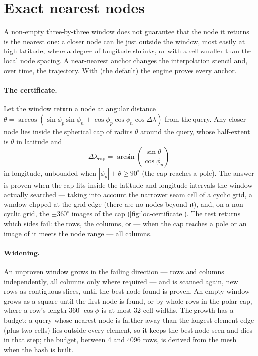 \section{Exact nearest nodes}\label{sec:loc-exact}

A non-empty three-by-three window does not guarantee that the node it returns is the nearest one: a
closer node can lie just outside the window, most easily at high latitude, where a degree of longitude
shrinks, or with a cell smaller than the local node spacing. A near-nearest anchor changes the
interpolation stencil and, over time, the trajectory. With  (the
default) the engine proves every anchor.

\paragraph{The certificate.} Let the window return a node at angular distance
$\theta=\arccos(\sin\phi_p\sin\phi_n+\cos\phi_p\cos\phi_n\cos\Delta\lambda)$ from the query. Any closer
node lies inside the spherical cap of radius $\theta$ around the query, whose half-extent is $\theta$
in latitude and
\begin{equation}\label{eq:loc-cap}
  \Delta\lambda_{\text{cap}}=\arcsin\!\left(\frac{\sin\theta}{\cos\phi_p}\right)
\end{equation}
in longitude, unbounded when $|\phi_p|+\theta\ge 90^\circ$ (the cap reaches a pole). The answer is
proven when the cap fits inside the latitude and longitude intervals the window actually searched ---
taking into account the narrower seam cell of a cyclic grid, a window clipped at the grid edge (there
are no nodes beyond it), and, on a non-cyclic grid, the $\pm360^\circ$ images of the cap
(\cref{fig:loc-certificate}). The test returns which sides fail: the rows, the columns, or --- when the
cap reaches a pole or an image of it meets the node range --- all columns.

\paragraph{Widening.} An unproven window grows in the failing direction --- rows and columns
independently, all columns only where required --- and is scanned again, new rows as contiguous slices,
until the best node found is proven. An empty window grows as a square until the first node is found,
or by whole rows in the polar cap, where a row's length $360^\circ\cos\phi$ is at most 32 cell widths. The growth has a budget: a query
whose nearest node is farther away than the longest element edge (plus two cells) lies outside every
element, so it keeps the best node seen and dies in that step; the budget, between 4 and 4096 rows, is
derived from the mesh when the hash is built.


